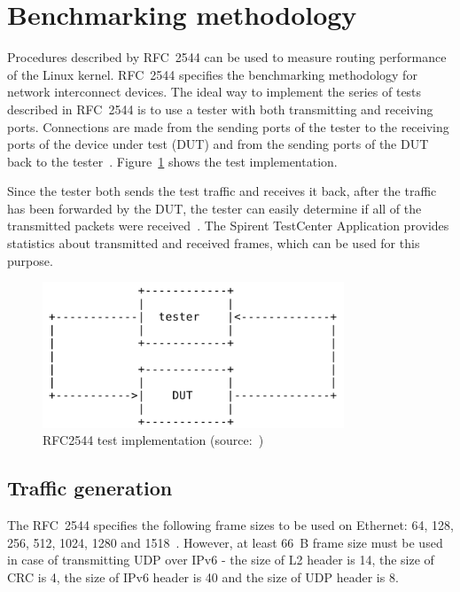 
\section{Benchmarking methodology}\label{sec:analysis-metodology}
Procedures described by RFC~2544 can be used to measure routing performance of the Linux kernel.
RFC~2544 specifies the benchmarking methodology for network interconnect devices.
The ideal way to implement the series of tests described in RFC~2544 is to use a tester
with both transmitting and receiving ports.
Connections are made from the sending ports of the tester to the receiving ports of the
device under test (DUT) and from the sending ports of the DUT back to the tester~\cite{rfc2544}.
Figure~\ref{fig:analysis-rfc2544} shows the test implementation.

Since the tester both sends the test traffic and receives
it back, after the traffic has been forwarded by the DUT, the tester
can easily determine if all of the transmitted packets were received~\cite{rfc2544}.
The Spirent TestCenter Application provides statistics about transmitted and received frames,
which can be used for this purpose.
\begin{figure}
	\centering
	\includegraphics[width=9cm,keepaspectratio]{fig/rfc2544.png}
	\caption{RFC2544 test implementation (source:~\cite{rfc2544})}
	\label{fig:analysis-rfc2544}
\end{figure}

\subsection{Traffic generation}
The RFC~2544 specifies the following frame sizes to be used on Ethernet:
64, 128, 256, 512, 1024, 1280 and 1518~\cite{rfc2544}.
However, at least 66~B frame size must be used in case of transmitting UDP over IPv6 - the size of L2 header is 14,
the size of CRC is 4, the size of IPv6 header is 40 and the size of UDP header is 8.

